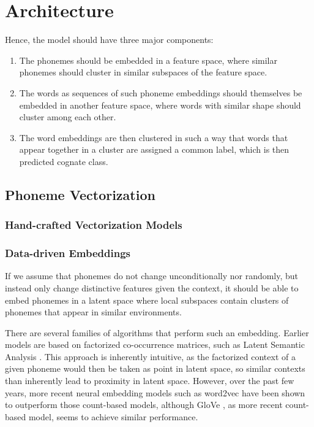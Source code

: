 \documentclass[8pt]{article}
\begin{document}
\section{Architecture}
Hence, the model should have three major components:
\begin{enumerate}
\item The phonemes should be embedded in a feature space, where similar phonemes should cluster in similar subspaces of the feature space. 
\item The words as sequences of such phoneme embeddings should themselves be embedded in another feature space, where words with similar shape should cluster among each other. 
\item The word embeddings are then clustered in such a way that words that appear together in a cluster are assigned a common label, which is then predicted cognate class.
\end{enumerate}

\subsection{Phoneme Vectorization}
\subsubsection{Hand-crafted Vectorization Models}
\subsubsection{Data-driven Embeddings}




If we assume that phonemes do not change unconditionally nor randomly, but instead only change distinctive features given the context, it should be able to embed phonemes in a latent space where local subspaces contain clusters of phonemes that appear in similar environments. 

There are several families of algorithms that perform such an embedding. Earlier models are based on factorized co-occurrence matrices, such as Latent Semantic Analysis \cite{landauer2013handbook}. This approach is inherently intuitive, as the factorized context of a given phoneme would then be taken as point in latent space, so similar contexts than inherently lead to proximity in latent space. However, over the past few years, more recent neural embedding models such as word2vec \cite{mikolov2013efficient,mikolov2013distributed,goldberg2014word2vec}  have been shown to outperform those count-based models, although GloVe \cite{pennington2014glove}, as more recent count-based model, seems to achieve similar performance.
\end{document}

